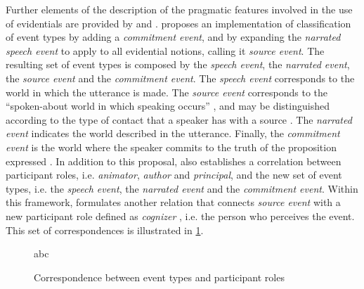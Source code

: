 \documentclass[output=paper]{langsci/langscibook}
\begin{document}
Further elements of the description of the pragmatic features involved in the use of evidentials are provided by \citet{Kockelman2004} and \citet{Bergqvist2018c}. \citet{Kockelman2004} proposes an implementation of  classification of event types by adding a \textit{commitment event}, and by expanding the \textit{narrated speech event} to apply to all evidential notions, calling it \textit{source event}. The resulting set of event types is composed by the \textit{speech event}, the \textit{narrated event}, the \textit{source event} and the \textit{commitment event}. The \textit{speech event} corresponds to the world in which the utterance is made. The \textit{source event} corresponds to the “spoken-about world in which speaking occurs” \citep[128]{Kockelman2004}, and may be distinguished according to the type of contact that a speaker has with a source \citep[143]{Kockelman2004}. The \textit{narrated event} indicates the world described in the utterance. Finally, the \textit{commitment event} is the world where the speaker commits to the truth of the proposition expressed \citep[127]{Kockelman2004}. In addition to this proposal, \citet{Kockelman2004} also establishes a correlation between  participant roles, i.e. \textit{animator}, \textit{author} and \textit{principal}, and the new set of event types, i.e. the \textit{speech event}, the \textit{narrated event} and the \textit{commitment event}. Within this framework, \citet{Bergqvist2018c} formulates another relation that connects \textit{source event} \citep[128]{Kockelman2004} with a new participant role defined as \textit{cognizer} \citep[22]{Bergqvist2018c}, i.e. the person who perceives the event. This set of correspondences is illustrated in \ref{fig:gq1}.


\begin{figure}
abc
\caption{Correspondence between event types and participant roles}
\label{fig:gq1}
\end{figure}
\end{document}
